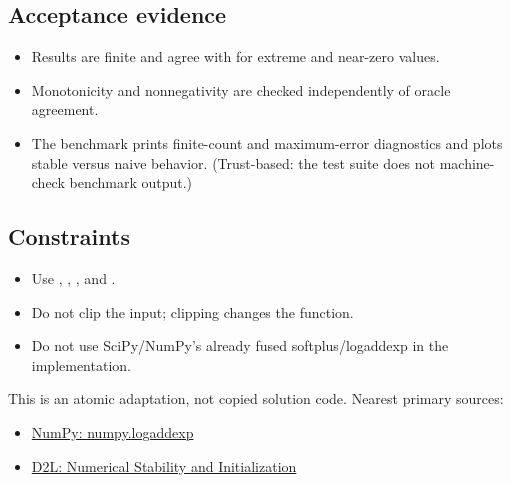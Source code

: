         \subsection{Acceptance evidence}

        \begin{evidencebox}
        \begin{itemize}
          \item Results are finite and agree with  for extreme and near-zero values.
  \item Monotonicity and nonnegativity are checked independently of oracle agreement.
  \item The benchmark prints finite-count and maximum-error diagnostics and plots stable versus naive behavior. (Trust-based: the test suite does not machine-check benchmark output.)
        \end{itemize}
        \end{evidencebox}

        \subsection{Constraints}

        \begin{itemize}
          \item Use , , , and .
  \item Do not clip the input; clipping changes the function.
  \item Do not use SciPy/NumPy's already fused softplus/logaddexp in the implementation.
        \end{itemize}

        \begin{sourcebox}
        This is an atomic adaptation, not copied solution code. Nearest primary sources:
        \begin{itemize}
          \item \href{https://numpy.org/doc/stable/reference/generated/numpy.logaddexp.html}{NumPy: numpy.logaddexp}
  \item \href{https://d2l.ai/chapter_multilayer-perceptrons/numerical-stability-and-init.html}{D2L: Numerical Stability and Initialization}
        \end{itemize}
        \end{sourcebox}
